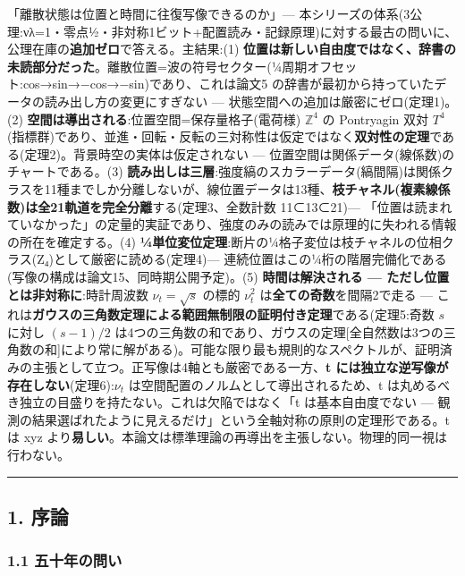 \documentclass[
]{ltjsarticle}
\begin{document}
「離散状態は位置と時間に往復写像できるのか」---
本シリーズの体系(3公理:νλ=1・零点½・非対称1ビット+配置読み・記録原理)に対する最古の問いに、公理在庫の\textbf{追加ゼロ}で答える。主結果:(1)
\textbf{位置は新しい自由度ではなく、辞書の未読部分だった}。離散位置=波の符号セクター(¼周期オフセット:cos→sin→−cos→−sin)であり、これは論文5
の辞書が最初から持っていたデータの読み出し方の変更にすぎない ---
状態空間への追加は厳密にゼロ(定理1)。(2)
\textbf{空間は導出される}:位置空間=保存量格子(電荷様) \(\mathbb{Z}^4\)
の Pontryagin 双対
\(T^4\)(指標群)であり、並進・回転・反転の三対称性は仮定ではなく\textbf{双対性の定理}である(定理2)。背景時空の実体は仮定されない
--- 位置空間は関係データ(線係数)のチャートである。(3)
\textbf{読み出しは三層}:強度縞のスカラーデータ(縞間隔)は関係クラスを11種までしか分離しないが、線位置データは13種、\textbf{枝チャネル(複素線係数)は全21軌道を完全分離}する(定理3、全数計数
11⊂13⊂21)---
「位置は読まれていなかった」の定量的実証であり、強度のみの読みでは原理的に失われる情報の所在を確定する。(4)
\textbf{¼単位変位定理}:断片の¼格子変位は枝チャネルの位相クラス(Z₄)として厳密に読める(定理4)---
連続位置はこの¼桁の階層完備化である(写像の構成は論文15、同時期公開予定)。(5)
\textbf{時間は解決される --- ただし位置とは非対称に}:時計周波数
\(\nu_t=\sqrt{s}\) の標的 \(\nu_t^2\) は\textbf{全ての奇数}を間隔2で走る
---
これは\textbf{ガウスの三角数定理による範囲無制限の証明付き定理}である(定理5:奇数
\(s\) に対し \((s-1)/2\)
は4つの三角数の和であり、ガウスの定理{[}全自然数は3つの三角数の和{]}により常に解がある)。可能な限り最も規則的なスペクトルが、証明済みの主張として立つ。正写像は4軸とも厳密である一方、\textbf{t
には独立な逆写像が存在しない}(定理6):\(\nu_t\)
は空間配置のノルムとして導出されるため、t
は丸めるべき独立の目盛りを持たない。これは欠陥ではなく「t
は基本自由度でない ---
観測の結果選ばれたように見えるだけ」という全軸対称の原則の定理形である。t
は xyz
より\textbf{易しい}。本論文は標準理論の再導出を主張しない。物理的同一視は行わない。

\begin{center}\rule{0.5\linewidth}{0.5pt}\end{center}

\subsection{1. 序論}\label{ux5e8fux8ad6}

\subsubsection{1.1
五十年の問い}\label{ux4e94ux5341ux5e74ux306eux554fux3044}
\end{document}
